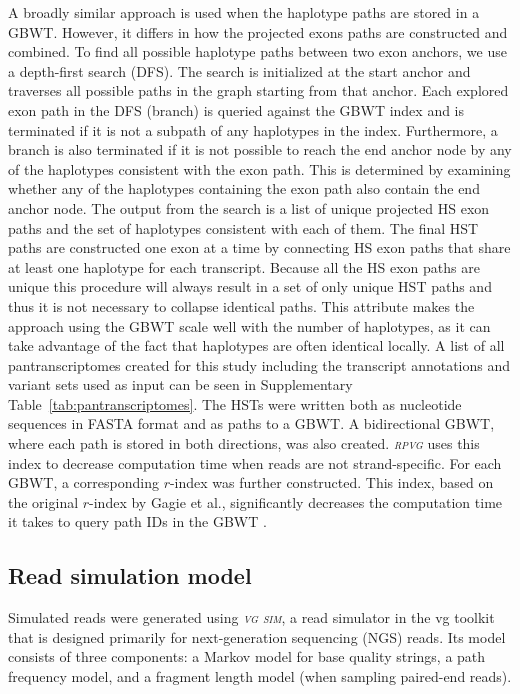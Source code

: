 \documentclass[11pt]{ucthesis}
\newcommand{\tool}[1]{\emph{\textsc{#1}}}
\begin{document}
A broadly similar approach is used when the haplotype paths are stored in a GBWT. However, it differs in how the projected exons paths are constructed and combined. To find all possible haplotype paths between two exon anchors, we use a depth-first search (DFS). The search is initialized at the start anchor and traverses all possible paths in the graph starting from that anchor. Each explored exon path in the DFS (branch) is queried against the GBWT index and is terminated if it is not a subpath of any haplotypes in the index. Furthermore, a branch is also terminated if it is not possible to reach the end anchor node by any of the haplotypes consistent with the exon path. This is determined by examining whether any of the haplotypes containing the exon path also contain the end anchor node. The output from the search is a list of unique projected HS exon paths and the set of haplotypes consistent with each of them. The final HST paths are constructed one exon at a time by connecting HS exon paths that share at least one haplotype for each transcript. Because all the HS exon paths are unique this procedure will always result in a set of only unique HST paths and thus it is not necessary to collapse identical paths. This attribute makes the approach using the GBWT scale well with the number of haplotypes, as it can take advantage of the fact that haplotypes are often identical locally.
\newline 
\newline
A list of all pantranscriptomes created for this study including the transcript annotations and variant sets used as input can be seen in Supplementary Table~\ref{tab:pantranscriptomes}. The HSTs were written both as nucleotide sequences in FASTA format and as paths to a GBWT. A bidirectional GBWT, where each path is stored in both directions, was also created. \tool{rpvg} uses this index to decrease computation time when reads are not strand-specific. For each GBWT, a corresponding $r$-index was further constructed. This index, based on the original $r$-index by Gagie et al., significantly decreases the computation time it takes to query path IDs in the GBWT \cite{Gagie2020-lq}.

\subsection{Read simulation model}

Simulated reads were generated using \tool{vg sim}, a read simulator in the vg toolkit that is designed primarily for next-generation sequencing (NGS) reads. Its model consists of three components: a Markov model for base quality strings, a path frequency model, and a fragment length model (when sampling paired-end reads).
\end{document}
